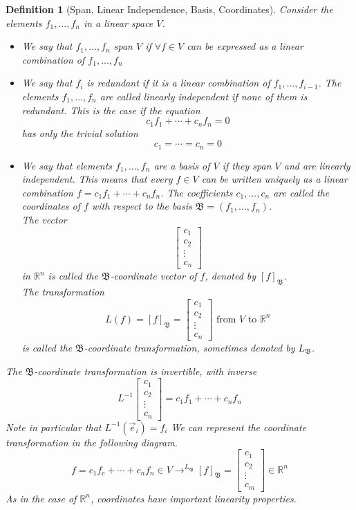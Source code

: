 \documentclass[10pt]{report}
\newtheorem{def2}{Definition}[section]
\begin{document}
\begin{def2}[Span, Linear Independence, Basis, Coordinates]
Consider the elements $f_1, ..., f_n$ in a linear space $V$.
\begin{itemize}
\item[a.] We say that $f_1, ...,f_n$ span $V$ if $\forall f\in V$ can be expressed as a linear combination of $f_1,..., f_n$
\item[b.] We say that $f_i$ is redundant if it is a linear combination of $f_1,..., f_{i-1}$. The elements $f_1,..., f_n$ are called linearly independent if none of them is redundant. This is the case if the equation
$$c_1f_1 + \cdots + c_nf_n=0$$
has only the trivial solution
$$c_1 = \cdots = c_n = 0$$
\item[c.] We say that elements $f_1,...,f_n$ are a basis of $V$ if they span $V$ and are linearly independent. This means that every $f\in V$ can be written uniquely as a linear combination $f=c_1f_1 + \cdots + c_nf_n$. The coefficients $c_1,...,c_n$ are called the coordinates of $f$ with respect to the basis $\mathfrak{B}=(f_1,...,f_n)$.\\
The vector
$$\left[\begin{array}{c}
c_1\\
c_2\\
\vdots\\
c_n
\end{array}\right]$$
in $\mathbb{R}^n$ is called the $\mathfrak{B}$-coordinate vector of $f$, denoted by $[f]_\mathfrak{B}$.\\
The transformation
$$L(f)=[f]_\mathfrak{B} = \left[\begin{array}{c}
c_1\\
c_2\\
\vdots\\
c_n
\end{array}\right] \text{ from } V \text{ to } \mathbb{R}^n$$
is called the $\mathfrak{B}$-coordinate transformation, sometimes denoted by $L_\mathfrak{B}$.
\end{itemize}
The $\mathfrak{B}$-coordinate transformation is invertible, with inverse
$$L^{-1}\left[\begin{array}{c}
c_1\\
c_2\\
\vdots\\
c_n
\end{array}\right] = c_1f_1 + \cdots + c_nf_n$$
Note in particular that $L^{-1}(\vec{e}_i) = f_i$
We can represent the coordinate transformation in the following diagram.
$$f=c_1f_c+\cdots +c_nf_n \in V \to^{L_\mathfrak{B}} [f]_\mathfrak{B} = \left[ \begin{array}{c}
c_1\\
c_2\\
\vdots\\
c_m
\end{array}\right] \in \mathbb{R}^n$$
As in the case of $\mathbb{R}^n$, coordinates have important linearity properties.
\end{def2}
\end{document}
